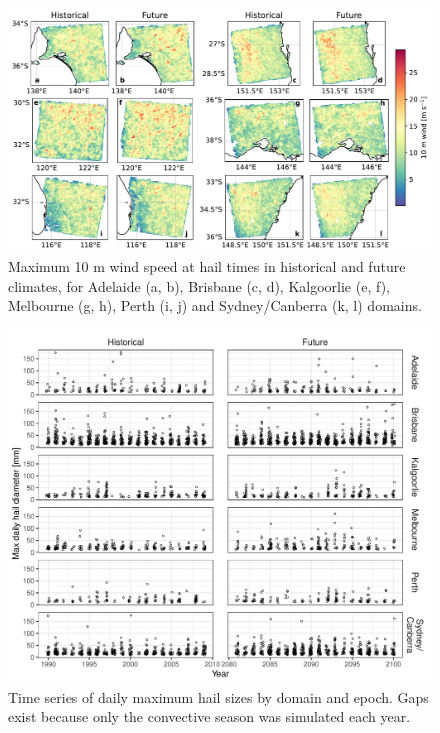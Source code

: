 \documentclass[draft,grl]{agutexSI2019}
\begin{document}
\begin{figure}[!ht]
    \includegraphics[width=\textwidth]{figures/max_10m_winds_by_domain}
    \caption{Maximum 10 m wind speed at hail times in historical and future climates, for Adelaide (a, b), Brisbane (c, d), Kalgoorlie (e, f), Melbourne (g, h), Perth (i, j) and Sydney/Canberra (k, l) domains.}
    \label{fig:max_wind_by_domain}
\end{figure}

\begin{figure}[!ht]
    \includegraphics[width=\textwidth]{figures/timeseries_hail}
    \caption{Time series of daily maximum hail sizes by domain and epoch. Gaps exist because only the convective season was simulated each year.}
    \label{fig:timeseries_hail}
\end{figure}
\end{document}
